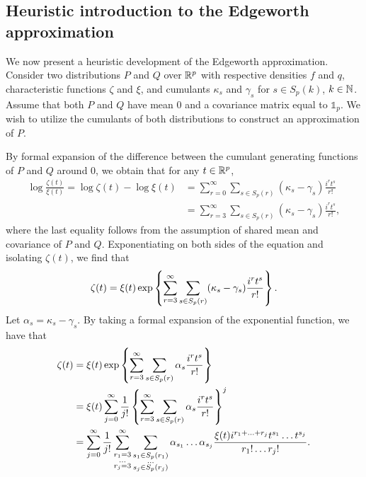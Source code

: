 \subsection{Heuristic introduction to the Edgeworth approximation} \label{sec-edgeworth}

We now present a heuristic development of the Edgeworth approximation. Consider two distributions $P$ and $Q$ over ${\mathbb{R}^p}$ with respective densities $f$ and $q$, characteristic functions $\zeta$ and $\xi$, and cumulants $\kappa_s$ and $\gamma_s$ for $s \in S_p(k)$, $k \in \mathbb{N}$. Assume that both $P$ and $Q$ have mean $0$ and a covariance matrix equal to $\mathbb{1}_p$. We wish to utilize the cumulants of both distributions to construct an approximation of $P$.

By formal expansion of the difference between the cumulant generating functions of $P$ and $Q$ around 0, we obtain that for any $t \in {\mathbb{R}^p}$,
\begin{align*}
    \log \frac{\zeta(t)}{\xi(t)}
    = \log \zeta(t) - \log \xi(t) 
    &= \sum_{r=0}^\infty \sum_{s \in S_p(r)} (\kappa_s - \gamma_s)\frac{i^r t^s}{r!}\\
    &= \sum_{r=3}^\infty \sum_{s \in S_p(r)} (\kappa_s - \gamma_s)\frac{i^r t^s}{r!},
\end{align*}
where the last equality follows from the assumption of shared mean and covariance of $P$ and $Q$. Exponentiating on both sides of the equation and isolating $\zeta(t)$, we find that
\begin{equation*}
    \zeta(t) = \xi(t)\exp\left\{\sum_{r=3}^\infty \sum_{s \in S_p(r)} (\kappa_s - \gamma_s)\frac{i^r t^s}{r!}\right\}.
\end{equation*}
Let $\alpha_s = \kappa_s - \gamma_s$. By taking a formal expansion of the exponential function, we have that
\begin{align*}
    \zeta(t)
    &= \xi(t)\exp\left\{\sum_{r=3}^\infty \sum_{s \in S_p(r)} \alpha_s\frac{i^r t^s}{r!}\right\}\\
    &= \xi(t)\sum_{j=0}^\infty \frac{1}{j!} \left\{\sum_{r=3}^\infty \sum_{s \in S_p(r)} \alpha_s\frac{i^r t^s}{r!}\right\}^j \\
    &=
    \sum_{j=0}^\infty \frac{1}{j!} 
    \sum_{\substack{r_1 = 3\\ \ldots \\r_j = 3}}^\infty
    \sum_{\substack{s_1 \in S_p(r_1)\\ \ldots \\s_j \in S_p(r_j)}}
    \alpha_{s_1}\ldots\alpha_{s_j}
    \frac{
        \xi(t) i^{r_1 + \ldots + r_j}
        t^{s_1} \ldots t^{s_j}
    }{
        r_1! \ldots r_j!
    }.
\end{align*}
